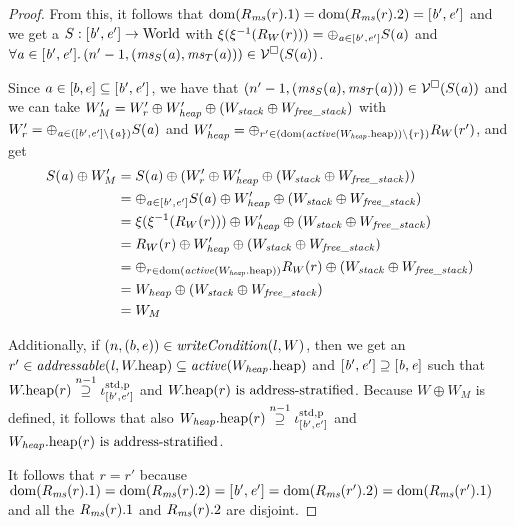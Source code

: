 \documentclass[a4paper]{article}
\begin{document}
\begin{proof}
  From this, it follows that $\dom(R_\ms(r).1) = \dom(R_\ms(r).2) = [\baddr',\eaddr']$ and we get a $S : [\baddr',\eaddr'] \fun \World$ with $\xi(\xi^{-1}(R_W(r))) = \oplus_{\aaddr \in [\baddr',\eaddr']} S(\aaddr)$ and $\forall \aaddr \in [\baddr',\eaddr'] \ldotp \npair[n'-1]{(\ms_S(\aaddr),\ms_T(\aaddr))} \in \lrv(S(\aaddr))$.

  Since $a \in [b,e] \subseteq [\baddr',\eaddr']$, we have that $\npair[n'-1]{(\ms_S(\aaddr),\ms_T(\aaddr))} \in \lrv(S(\aaddr))$ and
  we can take $W_M' = W_r' \oplus W_{\var{heap}}' \oplus (W_{\var{stack}} \oplus W_{\var{free\_stack}})$ with $W_r' = \oplus_{\aaddr \in ([\baddr',\eaddr']\setminus \{\aaddr\})} S(\aaddr)$ and $W_\var{heap}' = \oplus_{r' \in (\dom(\activeReg{\pwheap[W_\var{heap}]})\setminus \{r\})} R_W(r')$, and get
  \begin{align*}
    S(\aaddr) \oplus W_M'
    &=S(\aaddr) \oplus (W_r' \oplus W_\var{heap}'\oplus (W_{\var{stack}} \oplus W_{\var{free\_stack}}))\\
    &=
    \oplus_{\aaddr \in [\baddr',\eaddr']} S(\aaddr) \oplus W_{\var{heap}}'\oplus (W_{\var{stack}} \oplus W_{\var{free\_stack}})\\
    &=
    \xi(\xi^{-1}(R_W(r))) \oplus W_\var{heap}'\oplus (W_{\var{stack}} \oplus W_{\var{free\_stack}})\\
    &=
    R_W(r) \oplus W_\var{heap}'\oplus (W_{\var{stack}} \oplus W_{\var{free\_stack}})\\
    &=
    \oplus_{r \in \dom(\activeReg{\pwheap[W_\var{heap}]})} R_W(r)\oplus (W_{\var{stack}} \oplus W_{\var{free\_stack}})\\
    &=
      W_\var{heap} \oplus (W_{\var{stack}} \oplus W_{\var{free\_stack}})\\
      &= W_M
  \end{align*}

  Additionally, if $\npair{(b,e)}\in\writeCond{l,W}$, then
  we get an $r' \in \addressable{\lin, \pwheap} \subseteq \activeReg{\pwheap[W_\var{heap}]}$
  and $[\baddr',\eaddr'] \supseteq [\baddr,\eaddr]$ such that
  $\pwheap(r) \nsupeq[n-1] \stdreg{[\baddr',\eaddr']}{\pur}$ and
  $\pwheap(r) \text{ is address-stratified}$. Because $W \oplus W_M$ is defined, it follows that also 
  $\pwheap[W_\var{heap}](r) \nsupeq[n-1] \stdreg{[\baddr',\eaddr']}{\pur}$ and
  $\pwheap[W_\var{heap}](r) \text{ is address-stratified}$.

  It follows that $r = r'$ because $\dom(R_\ms(r).1) = \dom(R_\ms(r).2) = [\baddr',\eaddr'] = \dom(R_\ms(r').2) = \dom(R_\ms(r').1)$ and all the $R_\ms(r).1$ and $R_\ms(r).2$ are disjoint.


\end{proof}
\end{document}
